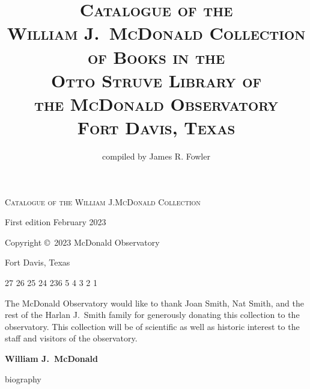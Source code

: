\documentclass[letterpaper]{book}
\begin{document}
\frontmatter
\thispagestyle{empty}
\vspace*{2.25 in}
\centerline{\textsc{\LARGE Catalogue of the William J.McDonald Collection}}
\newpage

\thispagestyle{empty}
\title{\textsc{Catalogue of the \\
    William J.~McDonald Collection \\
    of Books in the \\
    Otto Struve Library of \\
    the McDonald Observatory \\
    Fort Davis, Texas}}
\author{compiled by James R. Fowler}
\date{}

\maketitle
\newpage
\thispagestyle{empty}
\vspace*{5 in}
\centerline{First edition February 2023}
\centerline{Copyright \copyright\ 2023 McDonald Observatory}
\centerline{Fort Davis, Texas}
\centerline{ }
\centerline{27 26 25 24 23\hspace{3em}6 5 4 3 2 1}
\newpage

\thispagestyle{empty}
\noindent
The McDonald Observatory would like to thank Joan Smith,
Nat Smith, and the rest of the Harlan J.~Smith family
for generously donating this collection to the observatory.
This collection will be of scientific as well as historic
interest to the staff and visitors of the observatory.
\restoregeometry
\newpage


\pagestyle{plain}
\vspace*{1 in}
\centerline{\Large \bf William J.\ McDonald}
\bigskip\bigskip
{biography}
\newpage
\end{document}
